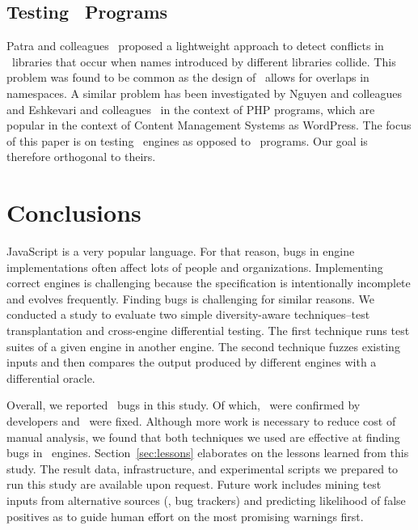 \documentclass[10pt,conference,anonymous]{IEEEtran}
\begin{document}
\subsection{Testing \js\ Programs}
Patra and colleagues~\cite{Patra:2018:CFU:3180155.3180184} proposed a
lightweight approach to detect conflicts in \js\ libraries that occur
when names introduced by different libraries collide. This problem was
found to be common as the design of \js\ allows for overlaps in
namespaces. A similar problem has been investigated by Nguyen and
colleagues~\cite{nguyen-etal-icse2014} and Eshkevari and
colleagues~\cite{eshkevari-etal-icpc2014} in the context of PHP
programs, which are popular in the context of Content Management
Systems as WordPress. The focus of this paper is on testing
\js\ engines as opposed to \js\ programs. Our goal is therefore
orthogonal to theirs.

\section{Conclusions}

JavaScript is a very popular language. For that reason, bugs in engine
implementations often affect lots of people and organizations.
Implementing correct engines is challenging because the specification
is intentionally incomplete and evolves frequently. Finding bugs is
challenging for similar reasons. We conducted a study to evaluate two
simple diversity-aware techniques--test transplantation and
cross-engine differential testing. The first technique runs test
suites of a given engine in another engine. The second technique
fuzzes existing inputs and then compares the output produced by
different engines with a differential oracle.

Overall, we reported \totalBugsReported\ bugs in this study. Of which,
\totalBugsConfirmed\ were confirmed by developers and
\totalBugsConfirmed\ were fixed. Although more work is necessary to
reduce cost of manual analysis, we found that both techniques we used
are effective at finding bugs in
\js\ engines. Section~\ref{sec:lessons} elaborates on the lessons
learned from this study. The result data, infrastructure, and
experimental scripts we prepared to run this study are available upon
request. Future work includes mining test inputs from alternative
sources (\eg{}, bug trackers) and predicting likelihood of false
positives as to guide human effort on the most promising warnings
first.

\balance


\end{document}
